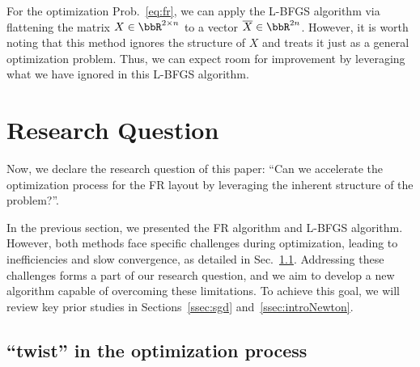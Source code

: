 \documentclass[dvipdfmx,10pt,journal,compsoc]{IEEEtran}
\begin{document}
For the optimization Prob.~\eqref{eq:fr}, we can apply the L-BFGS algorithm via flattening the matrix $X \in \bbR^{2 \times n}$ to a vector $\overline{X} \in \bbR^{2n}$.
However, it is worth noting that this method ignores the structure of $X$ and treats it just as a general optimization problem.
Thus, we can expect room for improvement by leveraging what we have ignored in this L-BFGS algorithm.

\section{Research Question}\label{sec:RQ}

Now, we declare the research question of this paper: ``Can we accelerate the optimization process for the FR layout by leveraging the inherent structure of the problem?''.

In the previous section, we presented the FR algorithm and L-BFGS algorithm. However, both methods face specific challenges during optimization, leading to inefficiencies and slow convergence, as detailed in Sec.~\ref{ssec:twist}.
Addressing these challenges forms a part of our research question, and we aim to develop a new algorithm capable of overcoming these limitations. To achieve this goal, we will review key prior studies in Sections~\ref{ssec:sgd} and~\ref{ssec:introNewton}.

\subsection{``twist'' in the optimization process}\label{ssec:twist}
\end{document}

